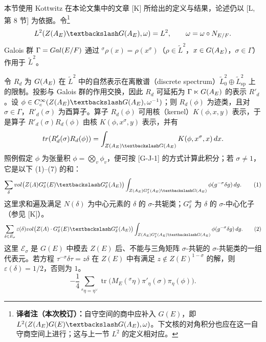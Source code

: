本节使用 Kottwitz 在本论文集中的文章 [K] 所给出的定义与结果，论述仍以 [L, 第 8 节] 为依据。令\footnote{\textbf{译者注（本次校订）：}自守空间的商中应补入 $G(E)$，即 $L^2(Z(\A_E)G(E)\backslash G(\A_E),\widetilde\omega)$。下文核的对角积分也应在这一自守商空间上进行；这与上一节 $L^2$ 的定义相对应。}
\[
 L^2(Z(\A_E)\backslash G(\A_E),\widetilde\omega)=\widetilde L^2,
 \qquad\widetilde\omega=\omega\circ N_{E/F}.
\]
Galois 群 $\Gamma=Gal(E/F)$ 通过 ${}^\sigma\rho(x)=\rho(x^\sigma)$（$\rho\in\widetilde L^2$，$x\in G(A_E)$，$\sigma\in\Gamma$）作用于 $\widetilde L^2$。

令 $R_d$ 为 $G(A_E)$ 在 $\widetilde L^2$ 中的自然表示在离散谱（discrete spectrum）$\widetilde L_0^2\oplus\widetilde L_{\mathrm{sp}}^2$ 上的限制。投影与 Galois 群的作用交换，因此 $R_d$ 可延拓为 $\Gamma\ltimes G(A_E)$ 的表示 $R'_d$。设 $\phi\in C_c^\infty(Z(\A_E)\backslash G(\A_E),\widetilde\omega^{-1})$；则 $R_d(\phi)$ 为迹类，且对 $\sigma\in\Gamma$，$R'_d(\sigma)$ 为酉算子。算子 $R_d(\phi)$ 可用核（kernel）$K(\phi,x,y)$ 表示，于是算子 $R'_d(\sigma)R_d(\phi)$ 由核 $K(\phi,x^\sigma,y)$ 表示，并有
\[
 \operatorname{tr}(R'_d(\sigma)R_d(\phi))
 =\int_{Z(\A_E)\backslash G(\A_E)}K(\phi,x^\sigma,x)\,dx.
\]
照例假定 $\phi$ 为张量积 $\phi=\bigotimes_v\phi_v$，便可按 [G-J-1] 的方式计算此积分；若 $\sigma\ne1$，它是以下 (1)--(7) 的和：
\begin{equation}
 \sum_\delta\operatorname{vol}\bigl(Z(\A)G_\delta^\sigma(E)
 \backslash G_\delta^\sigma(\A_E)\bigr)
 \int_{Z(\A_E)G_\delta^\sigma(\A_E)\backslash G(\A_E)}
 \phi(g^{-\sigma}\delta g)\,dg.
 \tag{1}
\end{equation}
这里求和遍及满足 $N(\delta)$ 为中心元素的 $\delta$ 的 $\sigma$-共轭类；$G_\delta^\sigma$ 为 $\delta$ 的 $\sigma$-中心化子（参见 [K]）。
\begin{equation}
 \sum_{\delta\in\mathcal E_\sigma}\varepsilon(\delta)
 \operatorname{vol}\bigl(Z(\A)\cdot G_\delta^\sigma(E)
 \backslash G_\delta^\sigma(\A_E)\bigr)
 \int_{Z(\A_E)G_\delta^\sigma(\A_E)\backslash G(\A_E)}
 \phi(g^{-\sigma}\delta g)\,dg.
 \tag{2}
\end{equation}
这里 $\mathcal E_\sigma$ 是 $G(E)$ 中模去 $Z(E)$ 后、不能与三角矩阵 $\sigma$-共轭的 $\sigma$-共轭类的一组代表元。若方程 $\tau^{-\sigma}\delta\tau=z\delta$ 在 $Z(E)$ 中有满足 $z\notin Z(E)^{1-\sigma}$ 的解，则 $\varepsilon(\delta)=1/2$，否则为 $1$。
\begin{equation}
 -\frac14\sum_{{}^\sigma\eta=\eta^\vee}
 \operatorname{tr}\bigl(M_E({}^\sigma\eta)\pi'_\eta(\sigma)\pi_\eta(\phi)\bigr).
 \tag{3}
\end{equation}
